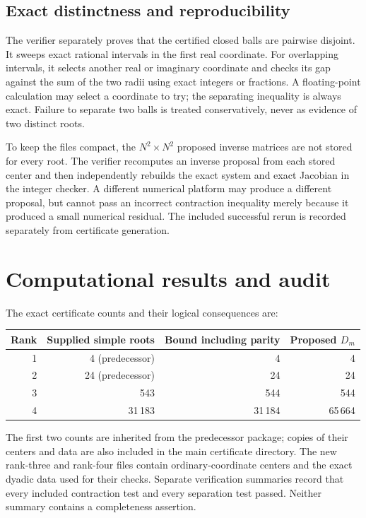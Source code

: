 \documentclass[11pt]{article}
\theoremstyle{remark}\newtheorem{remark}[theorem]{Remark}
\newcommand{\rankfourroots}{31\,183}
\newcommand{\rankfourbound}{31\,184}
\newcommand{\rankthreeroots}{543}
\begin{document}
\subsection{Exact distinctness and reproducibility}
The verifier separately proves that the certified closed balls are pairwise disjoint. It sweeps exact rational intervals in the first real coordinate. For overlapping intervals, it selects another real or imaginary coordinate and checks its gap against the sum of the two radii using exact integers or fractions. A floating-point calculation may select a coordinate to try; the separating inequality is always exact. Failure to separate two balls is treated conservatively, never as evidence of two distinct roots.

To keep the files compact, the $N^2\times N^2$ proposed inverse matrices are not stored for every root. The verifier recomputes an inverse proposal from each stored center and then independently rebuilds the exact system and exact Jacobian in the integer checker. A different numerical platform may produce a different proposal, but cannot pass an incorrect contraction inequality merely because it produced a small numerical residual. The included successful rerun is recorded separately from certificate generation.

\section{Computational results and audit}\label{sec:audit}
The exact certificate counts and their logical consequences are:
\begin{center}
\begin{tabular}{@{}rrrr@{}}\toprule
Rank & Supplied simple roots & Bound including parity & Proposed $D_m$\\\midrule
1 & 4 (predecessor) & 4 & 4\\
2 & 24 (predecessor) & 24 & 24\\
3 & \rankthreeroots & 544 & 544\\
4 & \rankfourroots & \rankfourbound & 65\,664\\\bottomrule
\end{tabular}
\end{center}
The first two counts are inherited from the predecessor package; copies of their centers and data are also included in the main certificate directory. The new rank-three and rank-four files contain ordinary-coordinate centers and the exact dyadic data used for their checks. Separate verification summaries record that every included contraction test and every separation test passed. Neither summary contains a completeness assertion.
\end{document}
